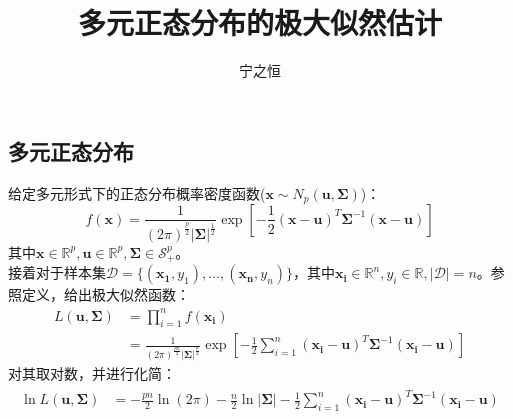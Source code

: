 \documentclass[12pt,a4paper]{ctexart}
\title{\heiti 多元正态分布的极大似然估计}
\author{宁之恒}
\date{}
\begin{document}
\maketitle
\subsection*{多元正态分布}
\noindent 给定多元形式下的正态分布概率密度函数($\boldsymbol{x} \sim N_p(\boldsymbol{u},\boldsymbol{\Sigma})$)：
\begin{equation*}
f(\boldsymbol{x})= \frac{1}{(2\pi)^\frac{p}{2} | \boldsymbol{\Sigma}|^\frac{1}{2}} 
\exp[{-\frac{1}{2}} (\boldsymbol{x-u})^T\boldsymbol{\Sigma}^{-1}(\boldsymbol{x-u})]
\end{equation*}
其中$\boldsymbol{x} \in \mathbb{R}^p, \boldsymbol{u} \in \mathbb{R}^p,\boldsymbol{\Sigma} \in \mathcal{S}_{+}^p$。\\
接着对于样本集$\mathcal{D}=\{(\boldsymbol{x_1},y_1),\ldots,(\boldsymbol{x_n},y_n)\}$，其中$\boldsymbol{x_i} \in \mathbb{R}^n,y_i \in \mathbb{R}, |\mathcal{D}|=n$。参照定义，给出极大似然函数：
\begin{equation*}
\begin{split}
L(\boldsymbol{u},\boldsymbol{\Sigma})
&=\prod_{i=1}^n f(\boldsymbol{x_i})\\
&= \frac{1}{(2\pi)^\frac{pn}{2} | \boldsymbol{\Sigma}|^\frac{n}{2}} 
\exp[{-\frac{1}{2}}  \sum_{i=1}^n (\boldsymbol{x_i-u})^T\boldsymbol{\Sigma}^{-1}(\boldsymbol{x_i-u})]
\end{split}
\end{equation*}
对其取对数，并进行化简：
\begin{align*}
\begin{split}
\ln{L(\boldsymbol{u},\boldsymbol{\Sigma})}
&=-\frac{pn}{2}\ln(2\pi) -\frac{n}{2}\ln|\boldsymbol{\Sigma}|-\frac{1}{2}\sum_{i=1}^n {(\boldsymbol{x_i-u})^T\boldsymbol{\Sigma}^{-1}(\boldsymbol{x_i-u})}
\end{split}
\end{align*}
\end{document}
